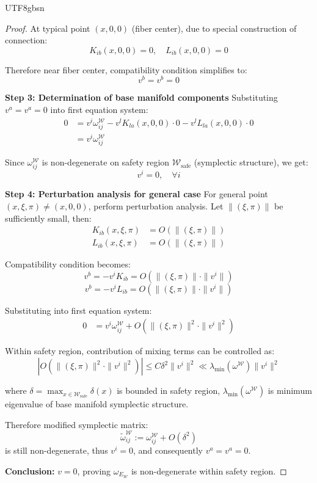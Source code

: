 \documentclass[a4paper,12pt]{extarticle}
\theoremstyle{definition}
\begin{document}
\begin{CJK}{UTF8}{gbsn}
\begin{proof}
At typical point $(x,0,0)$ (fiber center), due to special construction of connection:
$$K_{ib}(x,0,0) = 0, \quad L_{ib}(x,0,0) = 0$$

Therefore near fiber center, compatibility condition simplifies to:
$$v^b = v^b = 0$$

\textbf{Step 3: Determination of base manifold components}
Substituting $v^a = v^a = 0$ into first equation system:
\begin{align*}
0 &= v^i \omega_{ij}^{\mathcal{W}} - v^l K_{la}(x,0,0) \cdot 0 - v^l L_{la}(x,0,0) \cdot 0\\
&= v^i \omega_{ij}^{\mathcal{W}}
\end{align*}

Since $\omega^{\mathcal{W}}_{ij}$ is non-degenerate on safety region $\mathcal{W}_{\text{safe}}$ (symplectic structure), we get:
$$v^i = 0, \quad \forall i$$

\textbf{Step 4: Perturbation analysis for general case}
For general point $(x,\xi,\pi) \neq (x,0,0)$, perform perturbation analysis. Let $\|(\xi,\pi)\|$ be sufficiently small, then:
\begin{align*}
K_{ib}(x,\xi,\pi) &= O(\|(\xi,\pi)\|)\\
L_{ib}(x,\xi,\pi) &= O(\|(\xi,\pi)\|)
\end{align*}

Compatibility condition becomes:
$$v^b = -v^i K_{ib} = O(\|(\xi,\pi)\| \cdot \|v^i\|)$$
$$v^b = -v^i L_{ib} = O(\|(\xi,\pi)\| \cdot \|v^i\|)$$

Substituting into first equation system:
\begin{align*}
0 &= v^i \omega_{ij}^{\mathcal{W}} + O(\|(\xi,\pi)\|^2 \cdot \|v^i\|^2)
\end{align*}

Within safety region, contribution of mixing terms can be controlled as:
$$\left|O(\|(\xi,\pi)\|^2 \cdot \|v^i\|^2)\right| \leq C \delta^2 \|v^i\|^2 \ll \lambda_{\min}(\omega^{\mathcal{W}}) \|v^i\|^2$$

where $\delta = \max_{x \in \mathcal{W}_{\text{safe}}} \delta(x)$ is bounded in safety region, $\lambda_{\min}(\omega^{\mathcal{W}})$ is minimum eigenvalue of base manifold symplectic structure.

Therefore modified symplectic matrix:
$$\tilde{\omega}_{ij}^{\mathcal{W}} := \omega_{ij}^{\mathcal{W}} + O(\delta^2)$$
is still non-degenerate, thus $v^i = 0$, and consequently $v^a = v^a = 0$.

\textbf{Conclusion:} $v = 0$, proving $\omega_{E_{\mathcal{W}}}$ is non-degenerate within safety region.




\end{proof}
\end{CJK}
\end{document}
